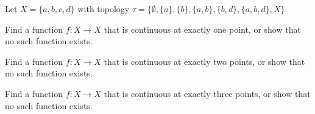 \item Let $X = \{a,b,c,d\}$ with topology $\tau = \{\emptyset, \{a\}, \{b\}, \{a,b\}, \{b,d\}, \{a,b,d\}, X\}$. 

\ba

\item Find a function $f: X \to X$ that is continuous at exactly one point, or show that no such function exists.

\item Find a function $f: X \to X$ that is continuous at exactly two points, or show that no such function exists.

\item Find a function $f: X \to X$ that is continuous at exactly three points, or show that no such function exists.

\ea

